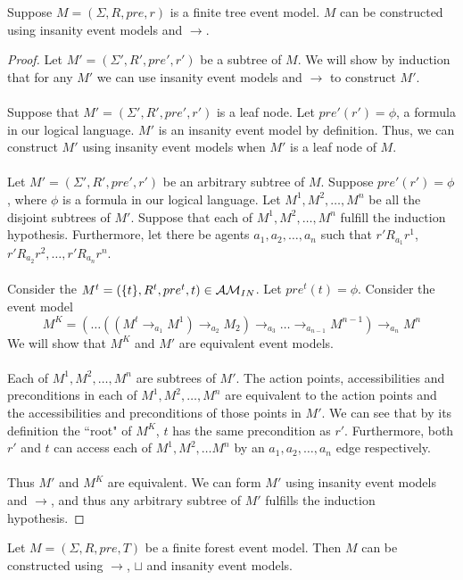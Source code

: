 \begin{lemma} \label{finTreeConstruct}
Suppose $M = (\Sigma, R, pre, r)$ is a finite tree event model.
$M$ can be constructed using insanity event models and $\to$.
\end{lemma}
\begin{proof}
Let $M' = (\Sigma', R', pre', r')$ be a subtree of $M$.
We will show by induction that for any $M'$ we can use insanity event models and $\to$ to
construct $M'$.\\
\\
Suppose that $M' = (\Sigma', R', pre', r')$ is a leaf node.
Let $pre'(r') = \phi$, a formula in our logical language.
$M'$ is an insanity event model by definition.
Thus, we can construct $M'$ using insanity event models when $M'$ is a leaf node of $M$.\\
\\
Let $M' = (\Sigma', R', pre', r')$ be an arbitrary subtree of $M$.
Suppose $pre'(r') = \phi$, where $\phi$ is a formula in our logical language.
Let $M^1, M^2, \ldots, M^n$ be all the disjoint subtrees of $M'$.
Suppose that each of $M^1, M^2, \ldots, M^n$ fulfill the induction hypothesis.
Furthermore, let there be agents $a_1, a_2, \ldots, a_n$ such that $r' R_{a_1} r^1$, $r' R_{a_2} r^2,
	\ldots, r' R_{a_n} r^n$.\\
\\
Consider the $M^t = (\{ t \}, R^t, pre^t, t) \in \mathcal{AM}_{IN}$.
Let $pre^t(t) = \phi$.
Consider the event model 
\[
M^K = (\ldots((M^t \to_{a_1} M ^ 1) \to_{a_2} M_2) \to_{a_3} \ldots
\to_{a_{n-1}} M^{n-1} ) \to_{a_n} M ^ n
\]
We will show that $M^K$ and $M'$ are equivalent event models.\\
\\
Each of $M^1, M^2, \ldots, M^n$ are subtrees of $M'$.
The action points, accessibilities and preconditions in each of $M^1, M^2, \ldots, M^n$ are
equivalent to the action points and the accessibilities and preconditions of those points in $M'$.
We can see that by its definition the ``root" of $M^K$, $t$ has the same precondition as $r'$.
Furthermore, both $r'$ and $t$ can access each of $M^1, M^2, \ldots M^n$ by an $a_1, a_2, \ldots, a_n$ edge
respectively.\\
\\
Thus $M'$ and $M^K$ are equivalent.
We can form $M'$ using insanity event models and $\to$, and thus any arbitrary subtree of $M'$
fulfills the induction hypothesis.
\end{proof}

\begin{lemma} \label{forestCon}
Let $M = (\Sigma, R, pre, T)$ be a finite forest event model.
Then $M$ can be constructed using $\to$, $\sqcup$ and insanity event models.
\end{lemma}

